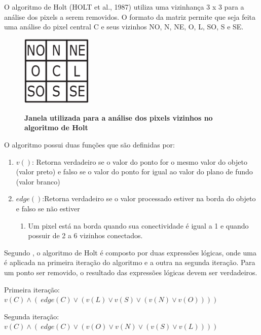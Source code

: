 \documentclass[12pt,oneside,a4paper,english,french,spanish,brazil,]{abntex2}
\begin{document}
O algoritmo de Holt (HOLT et al., 1987) utiliza uma vizinhança 3 x 3 para a análise dos pixels a serem removidos. O formato da matriz permite que seja feita uma análise do pixel central C e seus vizinhos NO, N, NE, O, L, SO, S e SE.

\begin{figure}[ht]
\centering
\caption{\textbf{Janela utilizada para a análise dos pixels vizinhos no algoritmo de Holt}}
\includegraphics[width=0.3\textwidth]{imagens/PDI_Holt_1.PNG}
\label{fig:PDI_Holt_1}
\end{figure}

O algoritmo possui duas funções que são definidas por:
\begin{enumerate}
\item \(v()\): Retorna verdadeiro se o valor do ponto for o mesmo valor do objeto (valor preto) e falso se o valor do ponto for igual ao valor do plano de fundo (valor branco)
\item \(edge()\):Retorna verdadeiro se o valor processado estiver na borda do objeto e falso se não estiver
\begin{enumerate}[label*=\roman*.]
    \item Um pixel está na borda quando sua conectividade é igual a 1 e quando possuir de 2 a 6 vizinhos conectados. 
  \end{enumerate}
\end{enumerate}

Segundo \citet{guilherme:2007}, o algoritmo de Holt é composto por duas expressões lógicas, onde uma é aplicada na primeira iteração do algoritmo e a outra na segunda iteração. Para um ponto ser removido, o resultado das expressões lógicas devem ser verdadeiros.


Primeira iteração: 
\(v(C) \wedge (~ edge(C) \vee (v(L) \vee v(S) \vee (v(N) \vee v(O))))\)

Segunda iteração:
\(v(C) \wedge (~ edge(C) \vee (v(O) \vee v(N) \vee (v(S) \vee v(L))))\)
\end{document}
